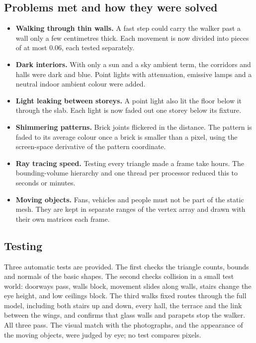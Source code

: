 \documentclass[11pt,a4paper]{article}
\begin{document}
\subsection{Problems met and how they were solved}
\begin{itemize}
\item \textbf{Walking through thin walls.} A fast step could carry the
walker past a wall only a few centimetres thick. Each movement is now
divided into pieces of at most $0.06$, each tested separately.
\item \textbf{Dark interiors.} With only a sun and a sky ambient term, the
corridors and halls were dark and blue. Point lights with attenuation,
emissive lamps and a neutral indoor ambient colour were added.
\item \textbf{Light leaking between storeys.} A point light also lit the
floor below it through the slab. Each light is now faded out one storey
below its fixture.
\item \textbf{Shimmering patterns.} Brick joints flickered in the distance.
The pattern is faded to its average colour once a brick is smaller than a
pixel, using the screen-space derivative of the pattern coordinate.
\item \textbf{Ray tracing speed.} Testing every triangle made a frame take
hours. The bounding-volume hierarchy and one thread per processor reduced
this to seconds or minutes.
\item \textbf{Moving objects.} Fans, vehicles and people must not be part of
the static mesh. They are kept in separate ranges of the vertex array and
drawn with their own matrices each frame.
\end{itemize}

\subsection{Testing}
Three automatic tests are provided. The first checks the triangle counts,
bounds and normals of the basic shapes. The second checks collision in a
small test world: doorways pass, walls block, movement slides along walls,
stairs change the eye height, and low ceilings block. The third walks fixed
routes through the full model, including both stairs up and down, every
hall, the terrace and the link between the wings, and confirms that glass
walls and parapets stop the walker. All three pass. The visual match with
the photographs, and the appearance of the moving objects, were judged by
eye; no test compares pixels.
\end{document}
